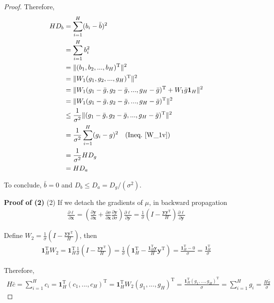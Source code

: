 \documentclass{article}
\newcommand*{\vect}[1]{\textbf{#1}}
\begin{document}
\begin{proof}
Therefore, 
\begin{equation}\begin{aligned}
HD_b&=\sum\limits_{i=1}^{H}(b_i-\bar b)^2\\
&=\sum\limits_{i=1}^{H}b_i^2\\
&=\|(b_1, b_2, ..., b_H)^\text{T}\|^2\\
&=\|W_1(g_1, g_2,..., g_H)^\text{T}\|^2\\
&=\|W_1(g_1-\bar g, g_2-\bar g,..., g_H-\bar g)^\text{T}+W_1\bar g\vect{1}_H\|^2\\
&=\|W_1(g_1-\bar g, g_2-\bar g,..., g_H-\bar g)^\text{T}\|^2\\
&\le \frac{1}{\sigma^2}\|(g_1-\bar g, g_2-\bar g,..., g_H-\bar g)^\text{T}\|^2\\
&=\frac{1}{\sigma^2}\sum\limits_{i=1}^H(g_i-g)^2\quad (\text{Ineq.~\ref{W_1v}})\\
&=\frac{1}{\sigma^2}HD_g\\
&=HD_a
\end{aligned}\end{equation}

To conclude, $\bar b=0$ and $D_b\le D_a=D_g/(\sigma^2)$.

\textbf{Proof of (2)}
(2) If we detach the gradients of $\mu$, in backward propagation
\begin{equation}\begin{aligned}
\frac{\partial\ell}{\partial\vect{x}}=(\frac{\partial\vect{y}}{\partial\vect{x}}+\frac{\partial\sigma}{\partial\vect{x}}\frac{\partial\vect{y}}{\partial\sigma})\frac{\partial\ell}{\partial\vect{y}}=\frac{1}{\sigma}(I-\frac{\vect{y}\vect{y}^\text{T}}{H})\frac{\partial\ell}{\partial\vect{y}}
\end{aligned}\end{equation}

Define $W_2=\frac{1}{\sigma}(I-\frac{\vect{y}\vect{y}^\text{T}}{H})$, then
\begin{equation}\begin{aligned}
\vect{1}_H^\text{T}W_2=\vect{1}_H^\text{T}\frac{1}{\sigma}(I-\frac{\vect{y}\vect{y}^\text{T}}{H})=\frac{1}{\sigma}(\vect{1}_H^\text{T}-\frac{\vect{1}_H^\text{T}\vect{y}}{H}\vect{y}^\text{T})=\frac{\vect{1}_H^\text{T}-0}{\sigma}=\frac{\vect{1}_H^\text{T}}{\sigma}
\end{aligned}\end{equation}

Therefore, 
\begin{equation}\begin{aligned}
H\bar c=\sum\limits_{i=1}^{H}c_i=\vect{1}_H^\text{T}(c_1,..., c_H)^\text{T}=\vect{1}_H^\text{T}W_2(g_1, ..., g_H)^\text{T}=\frac{\vect{1}_H^\text{T}(g_1,..., g_H)^\text{T}}{\sigma}=\sum\limits_{i=1}^{H}g_i=\frac{H\bar g}{\sigma}
\end{aligned}\end{equation}


\end{proof}
\end{document}
